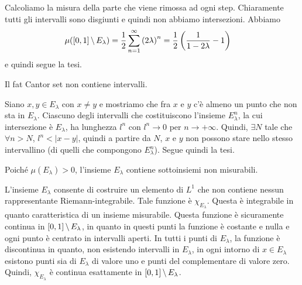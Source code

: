 \documentclass[a4paper]{article}
\begin{document}
\begin{radioactive}
\begin{snippetproof}{}
    Calcoliamo la misura della parte che viene rimossa ad ogni step.
    Chiaramente tutti gli intervalli sono disgiunti e quindi non abbiamo intersezioni.
    Abbiamo
    \begin{align*}
        \mu([0,1] \,\backslash\, E_\lambda)
        &= \frac{1}{2} \sum_{n=1}^\infty \left(2\lambda\right)^n
        = \frac12 \left(\frac{1}{1 - 2\lambda} - 1\right)
    \end{align*}
    e quindi segue la tesi.
\end{snippetproof}
\end{radioactive}

\begin{radioactive}
\begin{snippetproposition}{}
    Il fat Cantor set non contiene intervalli.
\end{snippetproposition}
\end{radioactive}

\begin{radioactive}
\begin{snippetproof}{}
    Siano \(x,y \in E_\lambda\) con \(x \neq y\)
    e mostriamo che fra \(x\) e \(y\) c'è almeno un punto
    che non sta in \(E_\lambda\).
    Ciascuno degli intervalli che costituiscono l'insieme \(E_\lambda^n\),
    la cui intersezione è \(E_\lambda\), ha lunghezza \(l^n\)
    con \(l^n \to 0\) per \(n \to +\infty\).
    Quindi, \(\exists N\) tale che \(\forall n > N\), \(l^n < |x-y|\),
    quindi a partire da \(N\), \(x\) e \(y\)
    non possono stare nello stesso intervallino (di quelli che compongono \(E_\lambda^n\)).
    Segue quindi la tesi.
\end{snippetproof}
\end{radioactive}

\begin{radioactive}
Poiché \(\mu(E_\lambda)>0\), l'insieme \(E_\lambda\) contiene sottoinsiemi non misurabili.
\end{radioactive}

\begin{radioactive}
L'insieme \(E_\lambda\) consente di costruire
un elemento di \(L^1\) che non contiene nessun
rappresentante Riemann-integrabile. Tale funzione è \(\chi_{E_\lambda}\).
Questa è integrabile in quanto caratteristica di un insieme misurabile.
Questa funzione è sicuramente continua in \([0,1] \,\backslash\, E_{\lambda}\),
in quanto in questi punti la funzione è costante e nulla e ogni punto è centrato in intervalli aperti.
In tutti i punti di \(E_{\lambda}\), la funzione è discontinua
in quanto, non esistendo intervalli in \(E_{\lambda}\), in ogni intorno di \(x \in E_\lambda\)
esistono punti sia di \(E_{\lambda}\) di valore uno e punti del complementare di valore zero.
Quindi, \(\chi_{E_\lambda}\) è continua esattamente in \([0,1] \,\backslash\, E_\lambda\).
\end{radioactive}
\end{document}
